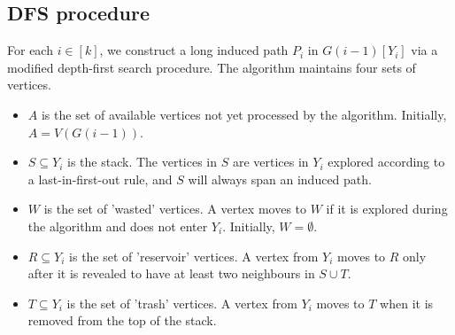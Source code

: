 \documentclass[reqno,a4paper]{amsart}
\theoremstyle{definition}
\begin{document}
\subsection{DFS procedure}\label{s: DFS}
For each $i\in[k]$, we construct a long induced path $P_i$ in $G(i-1)[Y_i]$ via a modified depth-first search procedure. The algorithm maintains four sets of vertices.
\begin{itemize}
    \item $A$ is the set of available vertices not yet processed by the algorithm. Initially, $A=V(G(i-1))$.
    \item $S\subseteq Y_i$ is the stack. The vertices in $S$ are vertices in $Y_i$ explored according to a last-in-first-out rule, and $S$ will always span an induced path.
    \item $W$ is the set of 'wasted' vertices. A vertex moves to $W$ if it is explored during the algorithm and does not enter $Y_i$. Initially, $W=\emptyset$.
    \item $R\subseteq Y_i$ is the set of 'reservoir' vertices. A vertex from $Y_i$ moves to $R$ only after it is revealed to have at least two neighbours in $S\cup T$.
    \item $T\subseteq Y_i$ is the set of 'trash' vertices. A vertex from $Y_i$ moves to $T$ when it is removed from the top of the stack.
\end{itemize}
\end{document}
